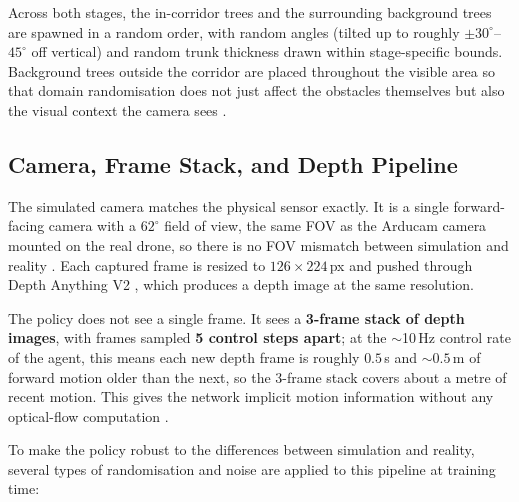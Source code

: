 \documentclass[../main.tex]{subfiles}
\begin{document}
Across both stages, the in-corridor trees and the surrounding background trees are spawned in a random order, with random angles (tilted up to roughly $\pm 30^{\circ}$--$45^{\circ}$ off vertical) and random trunk thickness drawn within stage-specific bounds. Background trees outside the corridor are placed throughout the visible area so that domain randomisation does not just affect the obstacles themselves but also the visual context the camera sees \cite{Loquercio2019}.

\subsection{Camera, Frame Stack, and Depth Pipeline}

The simulated camera matches the physical sensor exactly. It is a single forward-facing camera with a $62^{\circ}$ field of view, the same FOV as the Arducam camera mounted on the real drone, so there is no FOV mismatch between simulation and reality \cite{Loquercio2019,Zhao2020}. Each captured frame is resized to $126 \times 224$\,px and pushed through Depth Anything V2 \cite{Yang2024DepthAnythingV2}, which produces a depth image at the same resolution.

The policy does not see a single frame. It sees a \textbf{3-frame stack of depth images}, with frames sampled \textbf{5 control steps apart}; at the $\sim$10\,Hz control rate of the agent, this means each new depth frame is roughly $0.5$\,s and $\sim 0.5$\,m of forward motion older than the next, so the 3-frame stack covers about a metre of recent motion. This gives the network implicit motion information without any optical-flow computation \cite{Kabas2022}.

To make the policy robust to the differences between simulation and reality, several types of randomisation and noise are applied to this pipeline at training time:
\end{document}
